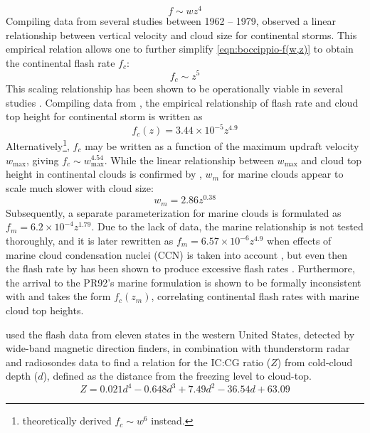 	\begin{equation}\label{eqn:boccippio-f(w,z)}
		f\sim wz^4
	\end{equation}
	Compiling data from several studies between 1962 -- 1979, \citet{Williams:1985fk} observed a linear relationship between vertical velocity and cloud size for continental storms. This empirical relation allows one to further simplify \ref{eqn:boccippio-f(w,z)} to obtain the continental flash rate $f_c$:
	\begin{equation}\label{eqn:w85-f(z)}
		f_c\sim z^5
	\end{equation}
	This scaling relationship has been shown to be operationally viable in several studies \citep[e.g.][]{Yoshida:2009vn, Ushio:2001kx}. Compiling data from \citet{Williams:1985fk}, the empirical relationship of flash rate and cloud top height for continental storm is written as \citep[][hereafter PR92]{Price:1992wb}
	\begin{equation}\label{eqn:pr92-fc(z)}
		f_c(z) = 3.44\times10^{-5}z^{4.9}
	\end{equation}
	Alternatively\footnote{\citet{Baker:1995uq} theoretically derived $f_c\sim w^6$ instead.}, $f_c$ may be written as a function of the maximum updraft velocity $w_{\max}$, giving $f_c\sim w_{\max}^{4.54}$. While the linear relationship between $w_{\max}$ and cloud top height in continental clouds is confirmed by \citet{Price:1992wb}, $w_m$ for marine clouds appear to scale much slower with cloud size:
	\begin{equation}\label{eqn:pr92-wm}
		w_m = 2.86z^{0.38}
	\end{equation}
	Subsequently, a separate parameterization for marine clouds is formulated as $f_m=6.2\times10^{-4}z^{1.79}$. Due to the lack of data, the marine relationship is not tested thoroughly, and it is later rewritten as $f_m=6.57\times10^{-6}z^{4.9}$ when effects of marine cloud condensation nuclei (CCN) is taken into account \citep{Michalon:1999fk}, but even then the flash rate by \citet{Michalon:1999fk} has been shown to produce excessive flash rates \citep{Jourdain:2001pi}. Furthermore, the arrival to the PR92's marine formulation is shown to be formally inconsistent with \citet{Vonnegut:1963aa} and takes the form $f_c(z_m)$, {\ie} correlating continental flash rates with marine cloud top heights\citep{Boccippio:2002uq}.

	\citet{Price:1993fk} used the flash data from eleven states in the western United States, detected by wide-band magnetic direction finders, in combination with thunderstorm radar and radiosondes data to find a relation for the IC:CG ratio ($Z$) from cold-cloud depth ($d$), defined as the distance from the freezing level to cloud-top.
	\begin{equation}\label{eqn:pr93-Z}
		Z = 0.021d^4-0.648d^3+7.49d^2-36.54d + 63.09
	\end{equation}
	
